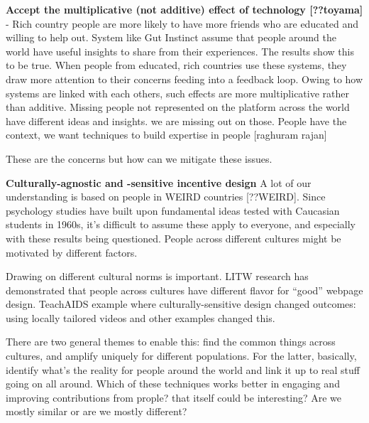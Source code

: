 \textbf{Accept the multiplicative (not additive) effect of technology [??toyama]} - Rich country people are more likely to have more friends who are educated and willing to help out. System like Gut Instinct assume that people around the world have useful insights to share from their experiences. The results show this to be true. When people from educated, rich countries use these systems, they draw more attention to their concerns feeding into a feedback loop. Owing to how systems are linked with each others, such effects are more multiplicative rather than additive.  Missing people not represented on the platform across the world have different ideas and insights. we are missing out on those. People have the context, we want techniques to build expertise in people [raghuram rajan]

These are the concerns but how can we mitigate these issues.


\textbf{Culturally-agnostic and -sensitive incentive design}
A lot of our understanding is based on people in WEIRD countries [??WEIRD]. Since psychology studies have built upon fundamental ideas tested with Caucasian students in 1960s, it’s difficult to assume these apply to everyone, and especially with these results being questioned. People across different cultures might be motivated by different factors. 

Drawing on different cultural norms is important. LITW research has demonstrated that people across cultures have different flavor for “good” webpage design. TeachAIDS example where culturally-sensitive design changed outcomes: using locally tailored videos and other examples changed this.

There are two general themes to enable this: find the common things across cultures, and amplify uniquely for different populations. For the latter, basically, identify what’s the reality for people around the world and link it up to real stuff going on all around. Which of these techniques works better in engaging and improving contributions from prople? that itself could be interesting? Are we mostly similar or are we mostly different?

